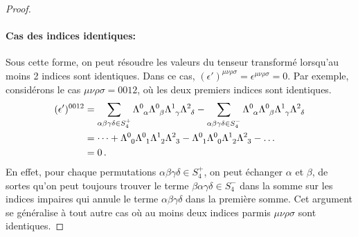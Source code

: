\documentclass{article}
\numberwithin{equation}{section}
\theoremstyle{solution}
\begin{document}
\begin{proof}
\paragraph{Cas des indices identiques:} Sous cette forme, on peut résoudre les valeurs du tenseur transformé lorsqu'au moins 2 indices sont identiques. Dans ce cas, 
$(\epsilon')^{\mu\nu\rho\sigma} = \epsilon^{\mu\nu\rho\sigma} = 0$. Par exemple, 
considérons le cas $\mu\nu\rho\sigma = 0012$, où les deux premiers indices sont identiques.
\begin{align*}
        (\epsilon')^{0012} &= 
        \sum_{\alpha\beta\gamma\delta \in S_4^{+}} 
 \Lambda\indices{^{0}_{\alpha}} \Lambda\indices{^{0}_{\beta}} \Lambda\indices{^{1}_{\gamma}} \Lambda\indices{^{2}_{\delta}} 
-
        \sum_{\alpha\beta\gamma\delta \in S_4^{-}} 
 \Lambda\indices{^{0}_{\alpha}} \Lambda\indices{^{0}_{\beta}} \Lambda\indices{^{1}_{\gamma}} \Lambda\indices{^{2 }_{\delta}}  \\
                           &= \dots + 
 \Lambda\indices{^{0}_{0}} \Lambda\indices{^{0}_{1}} \Lambda\indices{^{1}_{2}} \Lambda\indices{^{2}_{3}} 
-
\Lambda\indices{^{0}_{1}} \Lambda\indices{^{0}_{0}} \Lambda\indices{^{1}_{2}} \Lambda\indices{^{2}_{3}} 
-\dots \\
&= 0\, .
\end{align*}
En effet, pour chaque permutations $\alpha\beta\gamma\delta \in S_4^{+}$, on peut échanger $\alpha$ et $\beta$, 
de sortes qu'on peut toujours trouver le terme $\beta\alpha\gamma\delta \in S_4^{-}$ dans la somme 
sur les indices impaires qui annule le terme $\alpha\beta\gamma\delta$ dans la première somme.
Cet argument se généralise à tout autre cas où au moins deux indices parmis $\mu\nu\rho\sigma$ sont identiques.


\end{proof}
\end{document}

